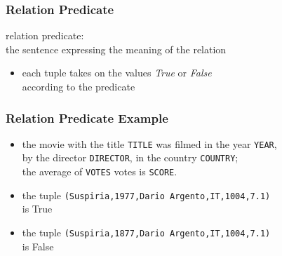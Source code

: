 \documentclass[dvipsnames]{beamer}
\theoremstyle{plain}
\begin{document}
\begin{frame}
  \frametitle{Relation Predicate}

  \begin{definition}
    \alert{relation predicate}:\\
      the sentence expressing the meaning of the relation

    \begin{itemize}
      \item each tuple takes on the values \emph{True} or \emph{False}\\
	according to the predicate
    \end{itemize}
  \end{definition}
\end{frame}

\begin{frame}
  \frametitle{Relation Predicate Example}

  \begin{example}
    \begin{itemize}
      \item the movie with the title \texttt{TITLE} was filmed in the year
	\texttt{YEAR},\\
        by the director \texttt{DIRECTOR}, in the country \texttt{COUNTRY};\\
        the average of \texttt{VOTES} votes is \texttt{SCORE}.

      \pause
      \medskip
      \item the tuple \texttt{(Suspiria,1977,Dario Argento,IT,1004,7.1)}\\
        is True
      \item the tuple \texttt{(Suspiria,1877,Dario Argento,IT,1004,7.1)}\\
        is False
    \end{itemize}
  \end{example}
\end{frame}
\end{document}
